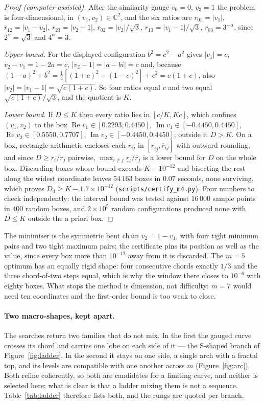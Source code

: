 \documentclass[11pt]{article}
\theoremstyle{remark}
\newcommand{\alp}{\alpha}
\begin{document}
\begin{proof}[Proof (computer-assisted)]
After the similarity gauge $v_0=0$, $v_3=1$ the problem is four-dimensional, in $(v_1,v_2)\in\mathbb{C}^2$,
and the six ratios are $r_{01}=|v_1|$, $r_{12}=|v_1-v_2|$, $r_{23}=|v_2-1|$, $r_{02}=|v_2|/\sqrt3$,
$r_{13}=|v_1-1|/\sqrt3$, $r_{03}=3^{-\alp}$, since $2^{\alp}=\sqrt3$ and $4^{\alp}=3$.

\emph{Upper bound.} For the displayed configuration $b^2=c^2-a^2$ gives $|v_1|=c$,
$v_2-v_1=1-2a=c$, $|v_2-1|=|a-bi|=c$ and, because $(1-a)^2+b^2=\tfrac14[(1+c)^2-(1-c)^2]+c^2=c(1+c)$,
also $|v_2|=|v_1-1|=\sqrt{c(1+c)}$. So four ratios equal $c$ and two equal $\sqrt{c(1+c)}/\sqrt3$,
and the quotient is $K$.

\emph{Lower bound.} If $D\le K$ then every ratio lies in $[c/K,Kc]$, which confines $(v_1,v_2)$ to the box
$\operatorname{Re}v_1\in[0.2293,0.4450]$, $\operatorname{Im}v_1\in[-0.4450,0.4450]$,
$\operatorname{Re}v_2\in[0.5550,0.7707]$, $\operatorname{Im}v_2\in[-0.4450,0.4450]$; outside it
$D>K$. On a box, rectangle arithmetic encloses each $r_{ij}$ in
$[\underline r_{ij},\overline r_{ij}]$ with outward rounding, and since $D\ge r_i/r_j$ pairwise,
$\max_{i\ne j}\underline r_i/\overline r_j$ is a lower bound for $D$ on the whole box. Discarding
boxes whose bound exceeds $K-10^{-12}$ and bisecting the rest along the widest coordinate leaves
$54\,163$ boxes in $0.07$ seconds, none surviving, which proves $D_4\ge K-1.7\times10^{-12}$
(\texttt{scripts/certify\_m4.py}). Four numbers to check independently: the interval bound was
tested against $16\,000$ sample points in $400$ random boxes, and $2\times10^5$ random
configurations produced none with $D\le K$ outside the a priori box.
\end{proof}

The minimiser is the symmetric bent chain $v_2=1-\overline{v_1}$, with four tight minimum pairs and
two tight maximum pairs; the certificate pins its position as well as the value, since every box
more than $10^{-12}$ away from it is discarded. The $m=5$ optimum has an equally rigid shape: four
consecutive chords exactly $1/3$ and the three chord-of-two steps equal, which is why the window
there closes to $10^{-6}$ with eighty boxes. What stops the method is dimension, not difficulty:
$m=7$ would need ten coordinates and the first-order bound is too weak to close.

\paragraph{Two macro-shapes, kept apart.} The searches return two families that do not mix. In the
first the gauged curve crosses its chord and carries one lobe on each side of it --- the S-shaped
branch of Figure~\ref{fig:ladder}. In the second it stays on one side, a single arch with a fractal
top, and its levels are compatible with one another across $m$ (Figure~\ref{fig:arc}). Both refine
coherently, so both are candidates for a limiting curve, and neither is selected here; what is
clear is that a ladder mixing them is not a sequence. Table~\ref{tab:ladder} therefore lists both,
and the rungs are quoted per branch.
\end{document}
